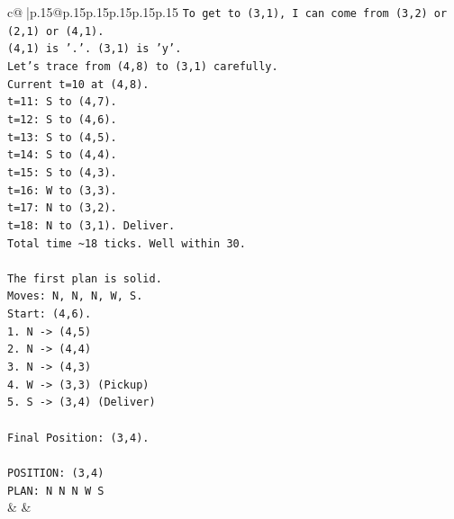 \documentclass{article}
\begin{document}
{\begin{supertabular}{c@{$\;$}|p{.15\linewidth}@{}p{.15\linewidth}p{.15\linewidth}p{.15\linewidth}p{.15\linewidth}p{.15\linewidth}}
{{{\texttt{To get to (3,1), I can come from (3,2) or (2,1) or (4,1).} \\
\texttt{(4,1) is '.'. (3,1) is 'y'.} \\
\texttt{Let's trace from (4,8) to (3,1) carefully.} \\
\texttt{Current t=10 at (4,8).} \\
\texttt{t=11: S to (4,7).} \\
\texttt{t=12: S to (4,6).} \\
\texttt{t=13: S to (4,5).} \\
\texttt{t=14: S to (4,4).} \\
\texttt{t=15: S to (4,3).} \\
\texttt{t=16: W to (3,3).} \\
\texttt{t=17: N to (3,2).} \\
\texttt{t=18: N to (3,1). Deliver.} \\
\texttt{Total time \textasciitilde{}18 ticks. Well within 30.} \\
\\ 
\texttt{The first plan is solid.} \\
\texttt{Moves: N, N, N, W, S.} \\
\texttt{Start: (4,6).} \\
\texttt{1. N {-}> (4,5)} \\
\texttt{2. N {-}> (4,4)} \\
\texttt{3. N {-}> (4,3)} \\
\texttt{4. W {-}> (3,3) (Pickup)} \\
\texttt{5. S {-}> (3,4) (Deliver)} \\
\\ 
\texttt{Final Position: (3,4).} \\
\\ 
\texttt{POSITION: (3,4)} \\
\texttt{PLAN: N N N W S} \\
            }
        }
    }
    & & \\ \\


\end{supertabular}}
\end{document}
